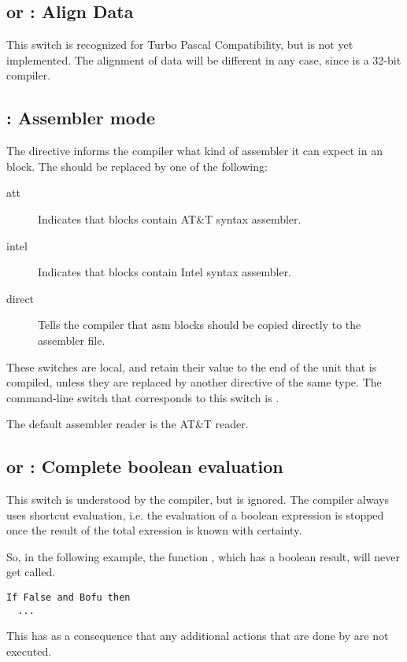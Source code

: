\subsection{ or  : Align Data}

This switch is recognized for Turbo Pascal Compatibility, but is not
yet implemented. The alignment of data will be different in any case, since
\fpc is a 32-bit compiler.

\subsection{ : Assembler mode}
\label{se:AsmReader}

The  directive informs the compiler what kind of assembler
it can expect in an  block. The  should be replaced by one
of the following:
\begin{description}
\item [att\ ] Indicates that  blocks contain AT\&T syntax assembler.
\item [intel\ ] Indicates that  blocks contain Intel syntax
assembler.
\item [direct\ ] Tells the compiler that asm blocks should be copied
directly to the assembler file.
\end{description}
These switches are local, and retain their value to the end of the unit that
is compiled, unless they are replaced by another directive of the same type.
The command-line switch that corresponds to this switch is .

The default assembler reader is the AT\&T reader.

\subsection{ or  : Complete boolean evaluation}

This switch is understood by the \fpc compiler, but is ignored. The compiler
always uses shortcut evaluation, i.e. the evaluation of a boolean expression
is stopped once the result of the total exression is known with certainty.

So, in the following example, the function , which has a boolean
result, will never get called.
\begin{verbatim}
If False and Bofu then
  ...
\end{verbatim}
This has as a consequence that any additional actions that are done by
 are not executed.

